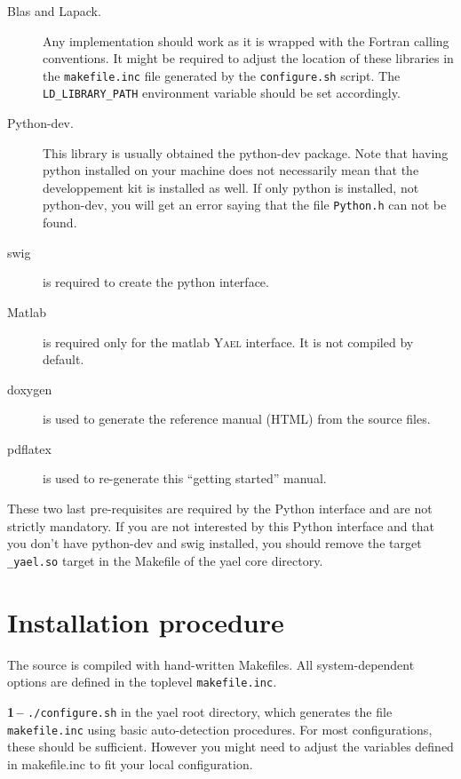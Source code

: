 \documentclass[a4paper,11pt,notitlepage,final,twoside]{report}
\newcommand{\yael}{\textsc{Yael}\xspace}
\newcommand{\tc}[1]{\texttt{#1}}
\begin{document}
\begin{description}
\item [Blas and Lapack.] Any implementation should work as it is
wrapped with the Fortran calling conventions. 
It might be required to adjust the location of these libraries in 
the \tc{makefile.inc} file generated by the \tc{configure.sh} script. 
The \tc{LD\_LIBRARY\_PATH} environment variable should be set accordingly. 

\item [Python-dev.] This library is usually obtained the python-dev package. 
Note that having python installed on your machine does not necessarily 
mean that the developpement kit is installed as well. 
If only python is installed, not python-dev, you will get an error 
saying that the file \tc{Python.h} can not be found. 

\item [swig] 
is required to create the python interface. 

\item [Matlab] is required only for the matlab \yael interface. 
It is not compiled by default. 


\item [doxygen] is used to generate the reference manual (HTML) from the source files. 

\item [pdflatex] is used to re-generate this ``getting started'' manual. 
\end{description}


These two last pre-requisites are required by the Python interface 
and are not strictly mandatory. If you are not interested by this 
Python interface and that you don't have python-dev and swig installed, 
you should remove the target \tc{\_yael.so} target in the Makefile of the 
yael core directory. 


\section{Installation procedure}

The source is compiled with hand-written Makefiles. 
All system-dependent options are defined in the toplevel \tc{makefile.inc}. 
\bigskip

{\bf 1\,--} \tc{./configure.sh} in the yael root directory, which generates 
the file \tc{makefile.inc} using basic auto-detection procedures. 
For most configurations, these should be sufficient. However you might need 
to adjust the variables defined in makefile.inc to fit your local configuration. 
\bigskip
\end{document}

